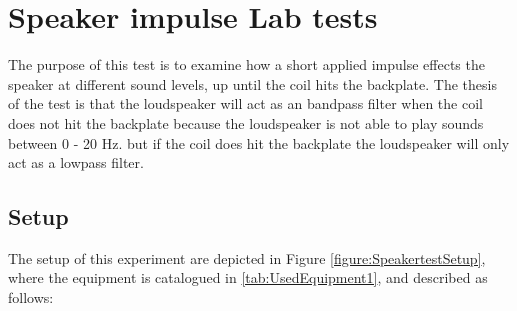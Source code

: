 \chapter{Speaker impulse Lab tests} \label{app:journal_speaker_test}

The purpose of this test is to examine how a short applied impulse effects the speaker at different sound levels, up until the coil hits the backplate. The thesis of the test is that the loudspeaker will act as an bandpass filter when the coil does not hit the backplate because the loudspeaker is not able to play sounds between 0 - 20 Hz. but if the coil does hit the backplate the loudspeaker will only act as a lowpass filter.




\section{Setup}

The setup of this experiment are depicted in Figure \ref{figure:SpeakertestSetup}, where the equipment is catalogued in \autoref{tab:UsedEquipment1}, and described as follows:

